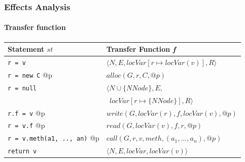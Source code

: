 \documentclass[hyperref={pdfpagelabels=false}]{beamer}
\begin{document}
\begin{frame}[fragile]
    \frametitle{Effects Analysis}
    \framesubtitle{Transfer function}

        \begin{tabular}{ l | l }
            Statement $st$                & Transfer Function \emph{f}\\
            \hline
            \verb/r = v/                     & $\langle N, E, locVar[r \mapsto locVar(v)], R \rangle$ \\
            \verb/r = new C/ @p              & $alloc(G, r, C, @p)$ \\
            \verb/r = null/                  & $\langle N \cup \{NNode\}, E,$ \\
                                             & $~~ locVar[r \mapsto \{ NNode \}], R \rangle$ \\
            \verb/r.f = v/ @p                & $write(G, locVar(r), f, locVar(v), @p)$ \\
            \verb/r = v.f/ @p                & $read(G, locVar(v), f, r, @p)$ \\
            \verb/r = v.meth(a1, .., an)/ @p & $call(G, r, v, meth, (a_1, ..., a_n), @p)$ \\
            \verb/return v/                  & $\langle N, E, locVar, locVar(v) \rangle$ \\
        \end{tabular}
\end{frame}
\end{document}
